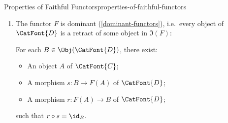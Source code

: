 \begin{proposition}{Properties of Faithful Functors}{properties-of-faithful-functors}
\begin{enumerate}
\begin{enumerate}
\[                        \epsilon%
                        \colon%
                        \Lan_{F}\circ F^{*}%
                        \Longrightarrow%
                        \id_{\Fun(\CatFont{D},\CatFont{X})}%
                    \]%
                    of the adjunction $\Lan_{F}\dashv F^{*}$ are all epimorphisms.
                \item\label{properties-of-faithful-functors-interaction-with-precomposition-3-g}The functor $F$ is dominant (\cref{dominant-functors}), i.e.\ every object of $\CatFont{D}$ is a retract of some object in $\Im(F)$:
                    \begin{itemize}
                        \itemstar For each $B\in\Obj(\CatFont{D})$, there exist:
                            \begin{itemize}
                                \item An object $A$ of $\CatFont{C}$;
                                \item A morphism $s\colon B\to F(A)$ of $\CatFont{D}$;
                                \item A morphism $r\colon F(A)\to B$ of $\CatFont{D}$;
                            \end{itemize}
                            such that $r\circ s=\id_{B}$.
                    \end{itemize}
            \end{enumerate}
    \end{enumerate}
\end{proposition}

